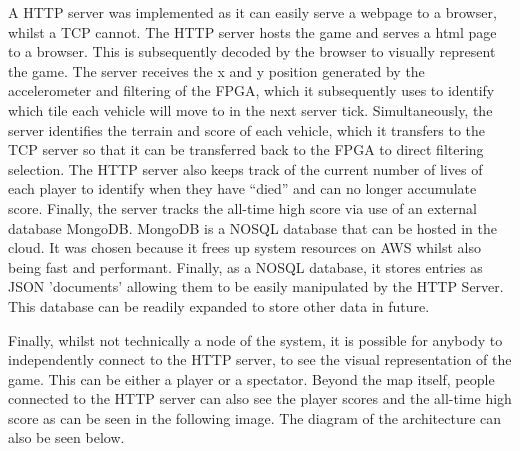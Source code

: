 \documentclass[12pt,a4paper]{article}
\begin{document}
{\scriptsize A HTTP server was implemented as it can easily serve a webpage to a browser, 
whilst a TCP cannot. The HTTP server hosts the game and serves a html page to 
a browser. This is subsequently decoded by the browser to visually represent 
the game. The server receives the x and y position generated by the accelerometer 
and filtering of the FPGA, which it subsequently uses to identify which tile each 
vehicle will move to in the next server tick. Simultaneously, the server identifies 
the terrain and score of each vehicle, which it transfers to the TCP server so that 
it can be transferred back to the FPGA to direct filtering selection. The HTTP 
server also keeps track of the current number of lives of each player to identify 
when they have “died” and can no longer accumulate score. Finally, the server tracks 
the all-time high score via use of an external database MongoDB. MongoDB is a NOSQL 
database that can be hosted in the cloud. It was chosen because it frees up system 
resources on AWS whilst also being fast and performant. Finally, as a NOSQL database, 
it stores entries as JSON 'documents' allowing them to be easily manipulated by the 
HTTP Server. This database can be readily expanded to store other data in future. }
\par
{\scriptsize Finally, whilst not technically a node of the system, it is possible for anybody to 
independently connect to the HTTP server, to see the visual representation of the 
game. This can be either a player or a spectator. Beyond the map itself, people 
connected to the HTTP server can also see the player scores and the all-time high 
score as can be seen in the following image. The diagram of the architecture can also be seen below.}
\par
\end{document}
